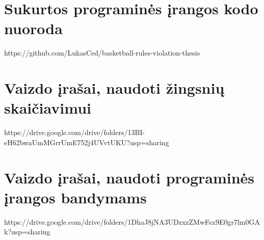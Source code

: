 \documentclass{VUMIFPSbakalaurinis}
\begin{document}
\printbibliography[heading=bibintoc]  %


\appendix  %

\section{Sukurtos programinės įrangos kodo nuoroda}
https://github.com/LukasCed/basketball-rules-violation-thesis

\section{Vaizdo įrašai, naudoti žingsnių skaičiavimui}
https://drive.google.com/drive/folders/13BI-eH62bwaUmMGrrUmE752j4UVvtUKU?usp=sharing

\section{Vaizdo įrašai, naudoti programinės įrangos bandymams}
https://drive.google.com/drive/folders/1DhaJ8jNA3UDzxzZMwFsx9E0gr7lm0GAk?usp=sharing
\end{document}
